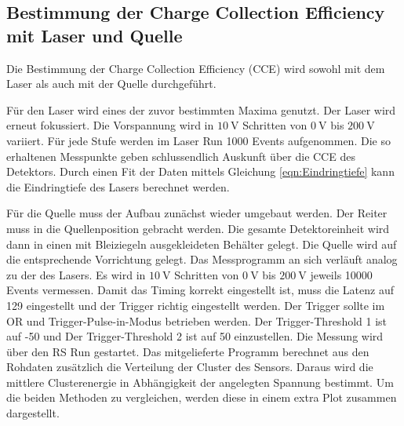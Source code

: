 \subsection{Bestimmung der Charge Collection Efficiency mit Laser und Quelle}

Die Bestimmung der Charge Collection Efficiency (CCE) wird sowohl mit dem Laser als auch mit der Quelle durchgeführt.

Für den Laser wird eines der zuvor bestimmten Maxima genutzt.
Der Laser wird erneut fokussiert.
Die Vorspannung wird in $\SI{10}{\volt}$ Schritten von $\SI{0}{\volt}$ bis $\SI{200}{\volt}$ variiert.
Für jede Stufe werden im Laser Run 1000 Events aufgenommen.
Die so erhaltenen Messpunkte geben schlussendlich Auskunft über die CCE des Detektors.
Durch einen Fit der Daten mittels Gleichung \eqref{eqn:Eindringtiefe} kann die Eindringtiefe des Lasers berechnet werden.

Für die Quelle muss der Aufbau zunächst wieder umgebaut werden.
Der Reiter muss in die Quellenposition gebracht werden.
Die gesamte Detektoreinheit wird dann in einen mit Bleiziegeln ausgekleideten Behälter gelegt.
Die Quelle wird auf die entsprechende Vorrichtung gelegt.
Das Messprogramm an sich verläuft analog zu der des Lasers.
Es wird in $\SI{10}{\volt}$ Schritten von $\SI{0}{\volt}$ bis $\SI{200}{\volt}$ jeweils 10000 Events vermessen.
Damit das Timing korrekt eingestellt ist, muss die Latenz auf 129 eingestellt und der Trigger richtig eingestellt werden.
Der Trigger sollte im OR und Trigger-Pulse-in-Modus betrieben werden.
Der Trigger-Threshold 1 ist auf -50 und Der Trigger-Threshold 2 ist auf 50 einzustellen.
Die Messung wird über den RS Run gestartet.
Das mitgelieferte Programm berechnet aus den Rohdaten zusätzlich die Verteilung der Cluster des Sensors.
Daraus wird die mittlere Clusterenergie in Abhängigkeit der angelegten Spannung bestimmt.
Um die beiden Methoden zu vergleichen, werden diese in einem extra Plot zusammen dargestellt.








%

